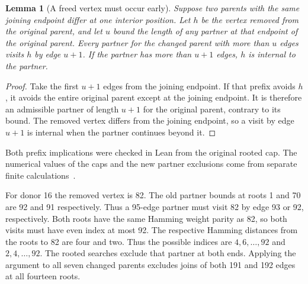 \documentclass[11pt,a4paper]{article}
\newtheorem{lemma}[theorem]{Lemma}
\theoremstyle{definition}
\theoremstyle{remark}
\begin{document}
\begin{lemma}[A freed vertex must occur early]
Suppose two parents with the same joining endpoint differ at one interior
position. Let $h$ be the vertex removed from the original parent,
and let $u$ bound the length of any partner at that endpoint of the
original parent. Every partner for the changed parent with more than
$u$ edges visits $h$ by edge $u+1$. If the partner has more than
$u+1$ edges, $h$ is internal to the partner.
\end{lemma}
\begin{proof}
Take the first $u+1$ edges from the joining endpoint. If that prefix
avoids $h$, it avoids the entire original parent except at the joining
endpoint. It is therefore an admissible partner of length $u+1$ for
the original parent, contrary to its bound. The removed vertex differs
from the joining endpoint, so a visit by edge $u+1$ is internal when
the partner continues beyond it.
\end{proof}

Both prefix implications were checked in Lean from the original rooted
cap. The numerical values of the caps and the new partner exclusions
come from separate finite calculations~\cite{corner250}.

For donor 16 the removed vertex is 82. The old partner bounds at roots
1 and 70 are 92 and 91 respectively. Thus a 95-edge partner must visit
82 by edge 93 or 92, respectively. Both roots have the same Hamming
weight parity as 82, so both visits must have even index at most 92.
The respective Hamming distances from the roots to 82 are four and
two. Thus the possible indices are $4,6,\ldots,92$ and $2,4,\ldots,92$.
The rooted searches exclude that partner at both ends. Applying the argument to all seven changed
parents excludes joins of both 191 and 192 edges at all fourteen roots.
\end{document}
